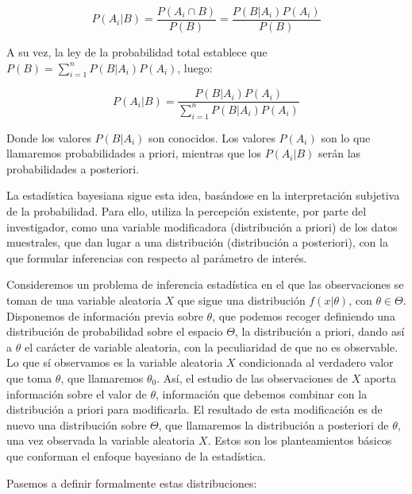 \documentclass{article}
\begin{document}
\begin{equation*}
	P(A_i|B)=\frac{P(A_i\cap B)}{P(B)}=\frac{P(B|A_i)P(A_i)}{P(B)}
\end{equation*}

A su vez, la ley de la probabilidad total establece que $P(B)=\sum_{i=1}^n{P(B|A_i)P(A_i)}$, luego:

\begin{equation*}
	P(A_i|B)=\frac{P(B|A_i)P(A_i)}{\sum_{i=1}^n{P(B|A_i)P(A_i)}}
\end{equation*}

Donde los valores $P(B|A_i)$ son conocidos. Los valores $P(A_i)$ son lo que llamaremos probabilidades a priori, mientras que los $P(A_i|B)$ serán las probabilidades a posteriori.

La estadística bayesiana sigue esta idea, basándose en la interpretación subjetiva de la probabilidad. Para ello, utiliza la percepción existente, por parte del investigador, como una variable modificadora (distribución a priori) de los datos muestrales, que dan lugar a una distribución (distribución a posteriori), con la que formular inferencias con respecto al parámetro de interés.

Consideremos un problema de inferencia estadística en el que las observaciones se toman de una variable aleatoria $X$ que sigue una distribución $f(x|\theta)$, con $\theta\in\Theta$. Disponemos de información previa sobre $\theta$, que podemos recoger definiendo una distribución de probabilidad sobre el espacio $\Theta$, la distribución a priori, dando así a $\theta$ el carácter de variable aleatoria, con la peculiaridad de que no es observable. Lo que sí observamos es la variable aleatoria $X$ condicionada al verdadero valor que toma $\theta$, que llamaremos $\theta_0$. Así, el estudio de las observaciones de $X$ aporta información sobre el valor de $\theta$, información que debemos combinar con la distribución a priori para modificarla. El resultado de esta modificación es de nuevo una distribución sobre $\Theta$, que llamaremos la distribución a posteriori de $\theta$, una vez observada la variable aleatoria $X$. Estos son los planteamientos básicos que conforman el enfoque bayesiano de la estadística.

Pasemos a definir formalmente estas distribuciones:
\end{document}
